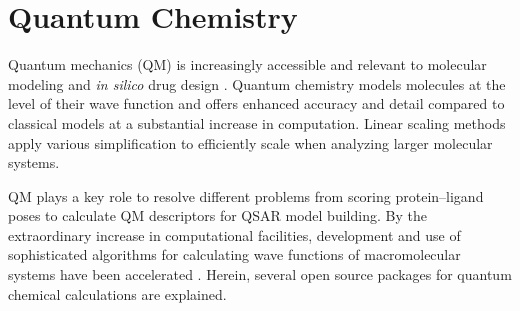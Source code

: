 \section{Quantum Chemistry}
Quantum mechanics (QM) is increasingly accessible and relevant to molecular modeling and \textit{in silico} drug design \cite{Vivo_2011}. Quantum chemistry models molecules at the level of their wave function and offers enhanced accuracy and detail compared to classical models at a substantial increase in computation.
Linear scaling methods apply various simplification to efficiently scale when analyzing larger molecular systems.

QM plays a key role to resolve different problems from scoring protein–ligand poses to calculate QM descriptors for QSAR model building.  By the extraordinary increase in computational facilities, development and use of sophisticated algorithms for calculating wave functions of macromolecular systems have been accelerated \cite{Merz_2010}. Herein, several open source packages for quantum chemical calculations are explained.	 